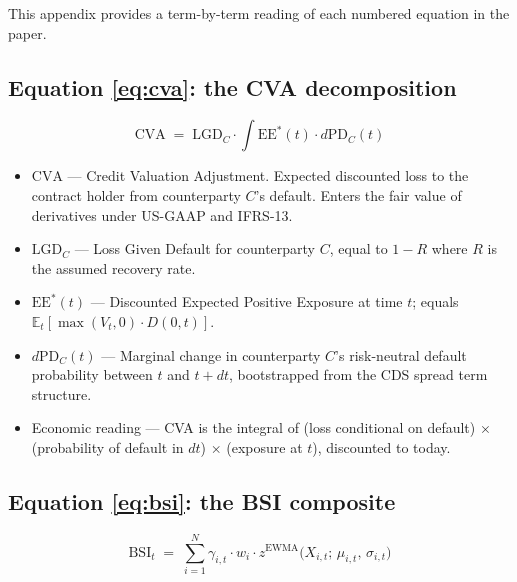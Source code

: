 \documentclass[11pt,a4paper]{article}
\begin{document}
This appendix provides a term-by-term reading of each numbered equation in the paper.

\subsection*{Equation \ref{eq:cva}: the CVA decomposition}

\[
\text{CVA} \;=\; \text{LGD}_C \cdot \int \text{EE}^{*}(t) \cdot d\text{PD}_C(t)
\]

\begin{itemize}[leftmargin=*]
\item $\text{CVA}$ --- Credit Valuation Adjustment. Expected discounted loss to the contract holder from counterparty $C$'s default. Enters the fair value of derivatives under US-GAAP and IFRS-13.
\item $\text{LGD}_C$ --- Loss Given Default for counterparty $C$, equal to $1 - R$ where $R$ is the assumed recovery rate.
\item $\text{EE}^{*}(t)$ --- Discounted Expected Positive Exposure at time $t$; equals $\mathbb{E}_t[\max(V_t, 0) \cdot D(0,t)]$.
\item $d\text{PD}_C(t)$ --- Marginal change in counterparty $C$'s risk-neutral default probability between $t$ and $t + dt$, bootstrapped from the CDS spread term structure.
\item Economic reading --- CVA is the integral of (loss conditional on default) $\times$ (probability of default in $dt$) $\times$ (exposure at $t$), discounted to today.
\end{itemize}

\subsection*{Equation \ref{eq:bsi}: the BSI composite}

\[
\text{BSI}_t \;=\; \sum_{i=1}^{N} \gamma_{i,t} \cdot w_i \cdot z^{\text{EWMA}}\!\big(X_{i,t};\,\mu_{i,t},\,\sigma_{i,t}\big)
\]
\end{document}
